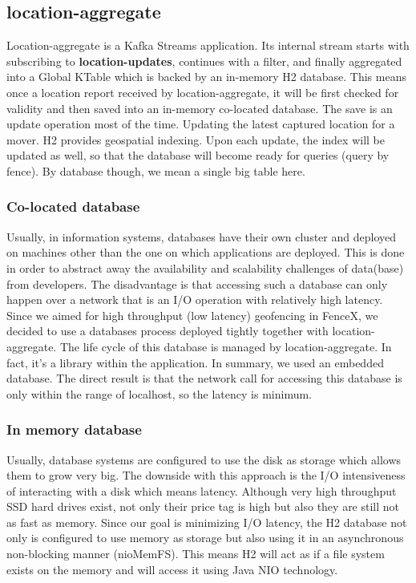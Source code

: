 \documentclass[a4]{report}
\begin{document}
    \subsection{location-aggregate}
    Location-aggregate is a Kafka Streams application.
    Its internal stream starts with subscribing to \textbf{location-updates}, continues with a filter, and finally aggregated into a Global KTable which is backed by an in-memory H2 database.
    This means once a location report received by location-aggregate, it will be first checked for validity and then
    saved into an in-memory co-located database.
    The save is an update operation most of the time.
    Updating the latest captured location for a mover.
    H2 provides geospatial indexing.
    Upon each update, the index will be updated as well, so that the database will become ready for queries (query by
    fence).
    By database though, we mean a single big table here.

    \subsubsection{Co-located database}
    Usually, in information systems, databases have their own cluster and deployed on machines other than the one on
    which applications are deployed.
    This is done in order to abstract away the availability and scalability challenges of data(base) from developers.
    The disadvantage is that accessing such a database can only happen over a network that is an I/O operation with relatively high latency.
    Since we aimed for high throughput (low latency) geofencing in FenceX, we decided to use a databases process
    deployed tightly together with location-aggregate.
    The life cycle of this database is managed by location-aggregate.
    In fact, it's a library within the application.
    In summary, we used an embedded database.
    The direct result is that the network call for accessing this database is only within the range of localhost, so the
    latency is minimum.

    \subsubsection{In memory database}
    Usually, database systems are configured to use the disk as storage which allows them to grow very big.
    The downside with this approach is the I/O intensiveness of interacting with a disk which means latency.
    Although very high throughput SSD hard drives exist, not only their price tag is high but also they are still not as fast as memory.
    Since our goal is minimizing I/O latency, the H2 database not only is configured to use memory as storage but also
    using it in an asynchronous non-blocking manner (nioMemFS).
    This means H2 will act as if a file system exists on the memory and will access it using Java NIO \cite{JavaNio} technology.
\end{document}
